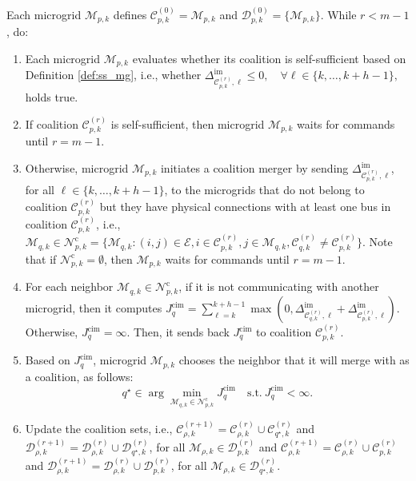 \begin{alg}
	\label{alg:clust}
	\hfill
	
	Each microgrid $\mathcal{M}_{p,k}$ defines $\mathcal{C}_{p,k}^{(0)}=\mathcal{M}_{p,k}$ and $\mathcal{D}_{p,k}^{(0)}=\{\mathcal{M}_{p,k}\}$. 
	While $r < m-1$, do:
	\begin{enumerate}
		
		\item Each microgrid $\mathcal{M}_{p,k}$ evaluates whether its coalition is self-sufficient based on Definition \ref{def:ss_mg}, i.e., whether $ \Delta_{\mathcal{C}_{p,k}^{(r)},\ell}^{\mathrm{im}} \leq 0, \quad \forall \ell \in \{k,\dots,k+h-1 \},$
		holds true. 
		\item If coalition $\mathcal{C}_{p,k}^{(r)}$ is self-sufficient, then microgrid $\mathcal{M}_{p,k}$ waits for commands until $r=m-1$.  
		\item Otherwise, microgrid $\mathcal{M}_{p,k}$ initiates a coalition merger by sending $\Delta_{\mathcal{C}_{p,k}^{(r)},\ell}^{\mathrm{im}}$, for all $\ell \in \{k,\dots,k+h-1 \}$, to the microgrids that do not belong to coalition $\mathcal{C}_{p,k}^{(r)}$ but they have physical connections with at least one bus in coalition $\mathcal{C}_{p,k}^{(r)}$, i.e.,  $\mathcal{M}_{q,k} \in \mathcal{N}_{p,k}^{\mathrm{c}}= \{\mathcal{M}_{q,k}: (i,j)\in \mathcal{E}, i \in \mathcal{C}_{p,k}^{(r)}, j \in \mathcal{M}_{q,k}, \mathcal{C}_{q,k}^{(r)} \neq \mathcal{C}_{p,k}^{(r)}  \}$. Note that if $\mathcal{N}_{p,k}^{\mathrm{c}}=\emptyset$, then $\mathcal{M}_{p,k}$ waits for commands until  $r=m-1$. \color{black}
		\item For each neighbor $\mathcal{M}_{q,k} \in \mathcal{N}_{p,k}^{\mathrm{c}}$, if it is not communicating with another microgrid, then it computes 
		$J_{q}^{\mathrm{cim}}= \sum_{\ell =k}^{k+h-1} \max\left(0,\Delta_{\mathcal{C}_{q,k}^{(r)},\ell}^{\mathrm{im}}+\Delta_{\mathcal{C}_{p,k}^{(r)},\ell}^{\mathrm{im}}\right).$ Otherwise, $J_{q}^{\mathrm{cim}}=\infty$. Then, it sends back $J_{q}^{\mathrm{cim}}$ to coalition $\mathcal{C}_{p,k}^{(r)}$.  
		\item Based on $J_{q}^{\mathrm{cim}}$, microgrid $\mathcal{M}_{p,k}$ chooses the neighbor that it will merge with as a coalition, as follows: 
		\begin{equation*}
		q^{\star}\in\arg\min_{\mathcal{M}_{q,k} \in \mathcal{N}_{p,k}^{\mathrm{c}}} J_{q}^{\mathrm{cim}} \quad \mathrm{s.t.} \ J_{q}^{\mathrm{cim}} < \infty.
		\end{equation*}
		\item Update the coalition sets, i.e.,  $\mathcal{C}_{\rho,k}^{(r+1)} = \mathcal{C}_{\rho,k}^{(r)}\cup \mathcal{C}_{q^{\star},k}^{(r)}$ and $\mathcal{D}_{\rho,k}^{(r+1)} = \mathcal{D}_{\rho,k}^{(r)} \cup \mathcal{D}_{q^{\star},k}^{(r)}$, for all $\mathcal{M}_{\rho,k}\in\mathcal{D}_{p,k}^{(r)}$ and $\mathcal{C}_{\rho,k}^{(r+1)} = \mathcal{C}_{\rho,k}^{(r)}\cup \mathcal{C}_{p,k}^{(r)}$ and $\mathcal{D}_{\rho,k}^{(r+1)} = \mathcal{D}_{\rho,k}^{(r)} \cup \mathcal{D}_{p,k}^{(r)}$, for all $\mathcal{M}_{\rho,k}\in\mathcal{D}_{q^{\star},k}^{(r)}$.%

\end{enumerate}
\end{alg}
